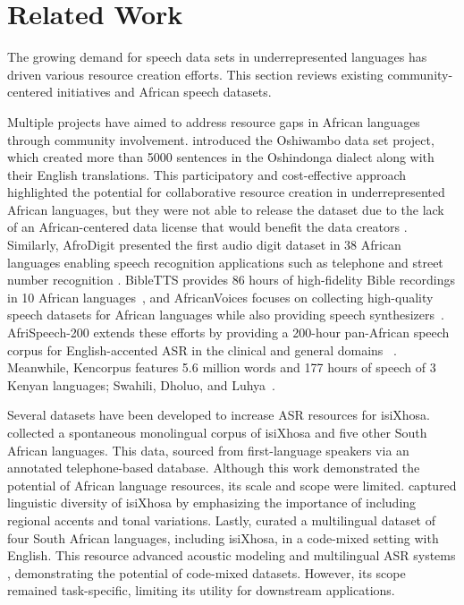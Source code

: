 \section{Related Work}
\label{sec:related}

The growing demand for speech data sets in underrepresented languages has driven various resource creation efforts. This section reviews existing community-centered initiatives and African speech datasets.

Multiple projects have aimed to address resource gaps in African languages through community involvement. \citet{nekotoparticipatory} introduced the Oshiwambo data set project, which created more than 5000 sentences in the Oshindonga dialect along with their English translations. This participatory and cost-effective approach highlighted the potential for collaborative resource creation in underrepresented African languages, but they were not able to release the dataset due to the lack of an African-centered data license that would benefit the data creators \cite{african_licenses}. Similarly, AfroDigit presented the first audio digit dataset in 38 African languages enabling speech recognition applications such as telephone and street number recognition \citep{emezue2023afrodigits}. BibleTTS provides 86 hours of high-fidelity Bible recordings in 10 African languages~\citep{meyer2022bibletts}, and AfricanVoices focuses on collecting high-quality speech datasets for African languages while also providing speech synthesizers~\citep{ogun20241000}. AfriSpeech-200 extends these efforts by providing a 200-hour pan-African speech corpus for English-accented ASR in the clinical and general domains~ \citep{olatunji2023afrispeech}. Meanwhile, Kencorpus features 5.6 million words and 177 hours of speech of 3 Kenyan languages; Swahili, Dholuo, and Luhya~\citep{wanjawa2022kencorpus}.

Several datasets have been developed to increase ASR resources for isiXhosa. \citet{louw2001african} collected a spontaneous monolingual corpus of isiXhosa and five other South African languages. This data, sourced from first-language speakers via an annotated telephone-based database. Although this work demonstrated the potential of African language resources, its scale and scope were limited. \citet{strom2018linguistic} captured linguistic diversity of isiXhosa by emphasizing the importance of including regional accents and tonal variations. Lastly, \citet{van2017synthesising} curated a multilingual dataset of four South African languages, including isiXhosa, in a code-mixed setting with English. This resource advanced acoustic modeling and multilingual ASR systems \cite{biswas2003semi}, demonstrating the potential of code-mixed datasets. However, its scope remained task-specific, limiting its utility for downstream applications.


